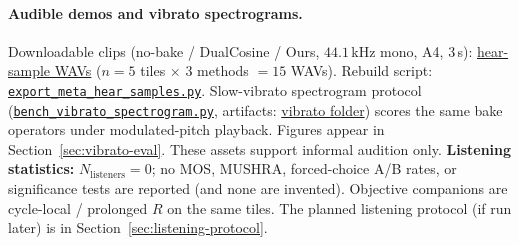 
\paragraph{Audible demos and vibrato spectrograms.}
Downloadable clips (no-bake / DualCosine / Ours, $44.1$\,kHz mono, A4, $3$\,s):
\href{https://github.com/reeldemo/reelsynth/tree/main/brand/artifacts/meta_approach_compare/hear_samples}{hear-sample WAVs}
($n{=}5$ tiles $\times$ $3$ methods $=15$ WAVs).
Rebuild script:
\href{https://github.com/reeldemo/reelsynth/blob/main/scripts/export_meta_hear_samples.py}{\texttt{export\_meta\_hear\_samples.py}}.
Slow-vibrato spectrogram protocol
(\href{https://github.com/reeldemo/reelsynth/blob/main/scripts/bench_vibrato_spectrogram.py}{\texttt{bench\_vibrato\_spectrogram.py}},
artifacts:
\href{https://github.com/reeldemo/reelsynth/tree/main/brand/artifacts/vibrato_spectrogram}{vibrato folder})
scores the same bake operators under modulated-pitch playback. Figures appear in Section~\ref{sec:vibrato-eval}.
These assets support informal audition only.
\textbf{Listening statistics:} $N_{\mathrm{listeners}}{=}0$; no MOS, MUSHRA, forced-choice A/B rates, or significance tests are reported (and none are invented).
Objective companions are cycle-local / prolonged $R$ on the same tiles.
The planned listening protocol (if run later) is in Section~\ref{sec:listening-protocol}.
